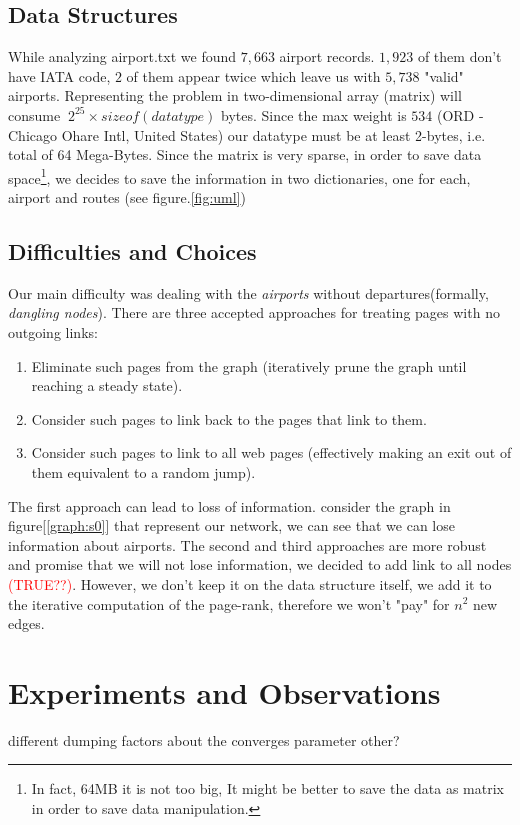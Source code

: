 \documentclass{article}
\begin{document}
\subsection{Data Structures}
While analyzing {\selectfont airport.txt} we found $7,663$ airport records. $1,923$ of them don't have IATA code, $2$ of them appear twice which leave us with $5,738$ "valid" airports. Representing the problem in two-dimensional array (matrix) will consume $~2^{25}\times sizeof(datatype)$ bytes. Since the max weight is $534$ (ORD - Chicago Ohare Intl, United States) our datatype must be at least 2-bytes, i.e. total of 64 Mega-Bytes. Since the matrix is very sparse, in order to save data space\footnote{In fact, 64MB it is not too big, It might be better to save the data as matrix in order to save data manipulation.}, we decides to save the information in two dictionaries, one for each, airport and routes (see figure.\ref{fig:uml}) 


\subsection{Difficulties and Choices}
\noindent{}
Our main difficulty was dealing with the \textit{airports} without departures(formally, \textit{dangling nodes}). There are three accepted approaches for treating pages with no outgoing links\cite{pageRank}:
\begin{enumerate}
    \item Eliminate such pages from the graph (iteratively prune the graph until reaching a steady state).
    \item Consider such pages to link back to the pages that link to them.
    \item Consider such pages to link to all web pages (effectively making an exit out of them equivalent to a random jump).
\end{enumerate}
The first approach can lead to loss of information. consider the graph in figure[\ref{graph:s0}] that represent our network, we can see that we can lose information about airports. The second and third approaches are more robust and promise that we will not lose information, we decided to add link to all nodes \textcolor{red}{(TRUE??)}. However, we don't keep it on the data structure itself, we add it to the iterative computation of the page-rank, therefore we won't "pay" for $n^2$ new edges.


\section{Experiments and Observations}
different dumping factors
about the converges parameter
other?


\newpage
\nocite{*}


\end{document}
